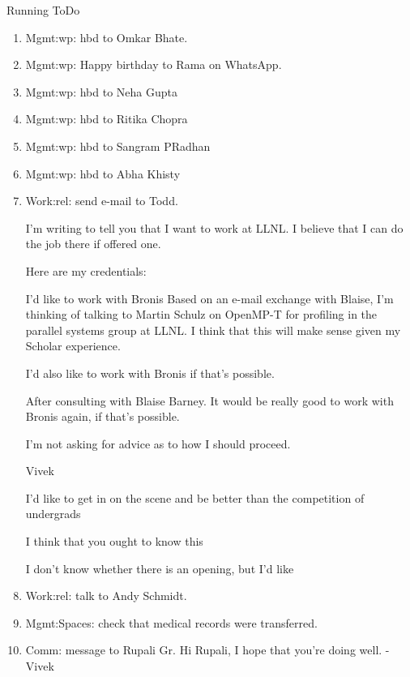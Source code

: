 \begin{columns}
\begin{column}{0.6\linewidth}
\begin{block}{Running ToDo}
\begin{enumerate}
     \item \tiny Mgmt:wp: hbd to Omkar Bhate. 

     \item \tiny Mgmt:wp: Happy birthday to Rama on WhatsApp. 

     \item \tiny Mgmt:wp: hbd to Neha Gupta  
     \item \tiny Mgmt:wp: hbd to Ritika Chopra  
     \item \tiny Mgmt:wp: hbd to Sangram PRadhan  
     \item \tiny Mgmt:wp: hbd to Abha Khisty  

     \item \tiny Work:rel:  send e-mail to Todd. 
       
       I'm writing to tell you that I want to work at LLNL. I
       believe that I can do the job there if offered one. 

       Here are my credentials: 

        I'd like to work with Bronis  
        Based on an e-mail exchange with Blaise, 
        I'm thinking of talking to Martin Schulz on  OpenMP-T for
        profiling in the parallel systems group at LLNL. 
        I think that this will make sense given my Scholar experience. 
        
        I'd also like to work with Bronis if that's possible.
        
        After consulting with Blaise Barney. It would be really
        good to work with Bronis again, if that's possible. 

        I'm not asking for advice as to how I should proceed. 

        Vivek 

        I'd like to get in on the scene and be better than the
        competition of undergrads 

        I think that you ought to know this 

        I don't know whether there is an opening, but I'd like 

      \item \tiny Work:rel: talk to Andy Schmidt. 

      \item \tiny Mgmt:Spaces: check that medical records were
        transferred.

        \item \tiny Comm: message to Rupali Gr. 
          Hi Rupali, I hope that you're doing well. -Vivek
 

\end{enumerate}
\end{block}
\end{column}
\end{columns}
